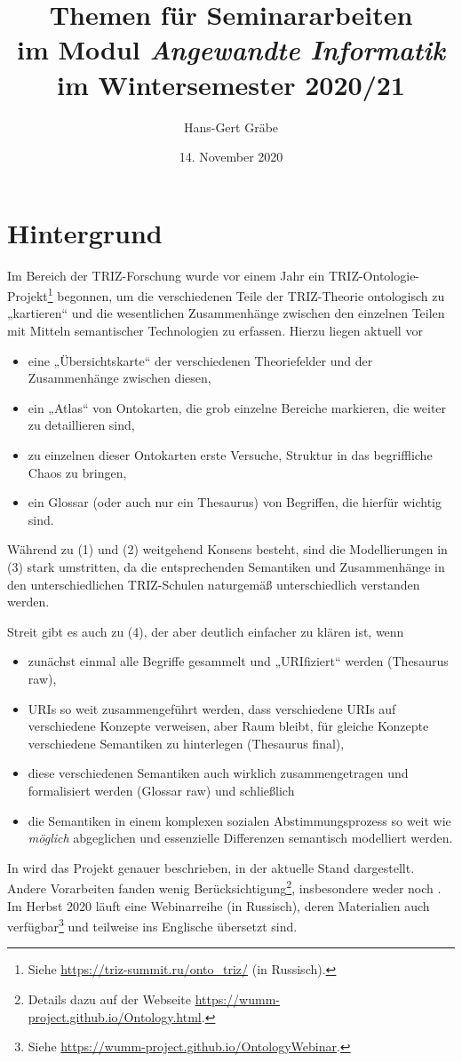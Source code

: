 \documentclass[11pt,a4paper]{article}
\title{Themen für Seminararbeiten\\ im Modul \emph{Angewandte Informatik}\\ im
  Wintersemester 2020/21}
\author{Hans-Gert Gr\"abe}
\date{14. November 2020}
\begin{document}
\maketitle

\section{Hintergrund}

Im Bereich der TRIZ-Forschung wurde vor einem Jahr ein
TRIZ-Ontologie-Projekt\footnote{Siehe \url{https://triz-summit.ru/onto_triz/}
  (in Russisch).}  begonnen, um die verschiedenen Teile der TRIZ-Theorie
ontologisch zu „kartieren“ und die wesentlichen Zusammenhänge zwischen den
einzelnen Teilen mit Mitteln semantischer Technologien zu erfassen. Hierzu
liegen aktuell vor
\begin{itemize}
\item[(1)] eine „Übersichtskarte“ der verschiedenen Theoriefelder und der
  Zusammenhänge zwischen diesen,
\item[(2)] ein „Atlas“ von Ontokarten, die grob einzelne Bereiche markieren,
  die weiter zu detaillieren sind,
\item[(3)] zu einzelnen dieser Ontokarten erste Versuche, Struktur in das
  begriff\-liche Chaos zu bringen,
\item[(4)] ein Glossar (oder auch nur ein Thesaurus) von Begriffen, die
  hierfür wichtig sind.
\end{itemize}

Während zu (1) und (2) weitgehend Konsens besteht, sind die Modellierungen in
(3) stark umstritten, da die entsprechenden Semantiken und Zusammenhänge in
den unterschiedlichen TRIZ-Schulen naturgemäß unterschiedlich verstanden
werden.

Streit gibt es auch zu (4), der aber deutlich einfacher zu klären ist, wenn 
\begin{itemize}
\item[(4a)] zunächst einmal alle Begriffe gesammelt und „URIfiziert“ werden
  (Thesaurus raw),
\item[(4b)] URIs so weit zusammengeführt werden, dass verschiedene URIs auf
  verschiedene Konzepte verweisen, aber Raum bleibt, für gleiche Konzepte
  verschiedene Semantiken zu hinterlegen (Thesaurus final),
\item[(4c)] diese verschiedenen Semantiken auch wirklich zusammengetragen und
  formalisiert werden (Glossar raw) und schließlich
\item[(4d)] die Semantiken in einem komplexen sozialen Abstimmungsprozess so
  weit wie \emph{möglich} abgeglichen und essenzielle Differenzen semantisch
  modelliert werden. 
\end{itemize}
In \cite{Kuryan2019} wird das Projekt genauer beschrieben, in
\cite{Kuryan2020} der aktuelle Stand dargestellt. Andere Vorarbeiten fanden
wenig Berücksichtigung\footnote{Details dazu auf der Webseite
  \url{https://wumm-project.github.io/Ontology.html}.}, insbesondere weder
\cite{IDM2011} noch \cite{VDI}. Im Herbst 2020 läuft eine Webinarreihe (in
Russisch), deren Materialien auch verfügbar\footnote{Siehe
  \url{https://wumm-project.github.io/OntologyWebinar}.} und teilweise ins
Englische übersetzt sind.
\end{document}
